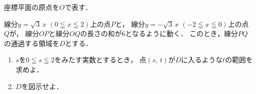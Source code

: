 \documentclass[../../main.tex]{subfiles}
\begin{document}
座標平面の原点を$O$で表す．

線分$y=\sqrt3 \, x$ $(0 \leqq x \leqq 2)$上の点$P$と，
線分$y=-\sqrt3 \, x$ $(-2 \leqq x \leqq 0)$上の点$Q$が，
線分$OP$と線分$OQ$の長さの和が6となるように動く．
このとき，線分$PQ$の通過する領域を$D$とする．
\begin{enumerate}
  \item $s$を$0 \leqq s \leqq 2$をみたす実数とするとき，
    点$(s, \, t)$が$D$に入るような$t$の範囲を求めよ．
  \item $D$を図示せよ．
\end{enumerate}
\end{document}
